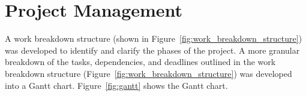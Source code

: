 \documentclass{article}
\begin{document}

\clearpage
\FloatBarrier
\section{Project Management} %
    \label{sec:project_management}

        A work breakdown structure
        (shown in Figure~\ref{fig:work_breakdown_structure})
        was developed to identify and clarify the phases of the project.
        A more granular breakdown of the tasks, dependencies, and deadlines
        outlined in the work breakdown structure (Figure~\ref{fig:work_breakdown_structure})
        was developed into a Gantt chart.
        Figure~\ref{fig:gantt} shows the Gantt chart.
\end{document}
